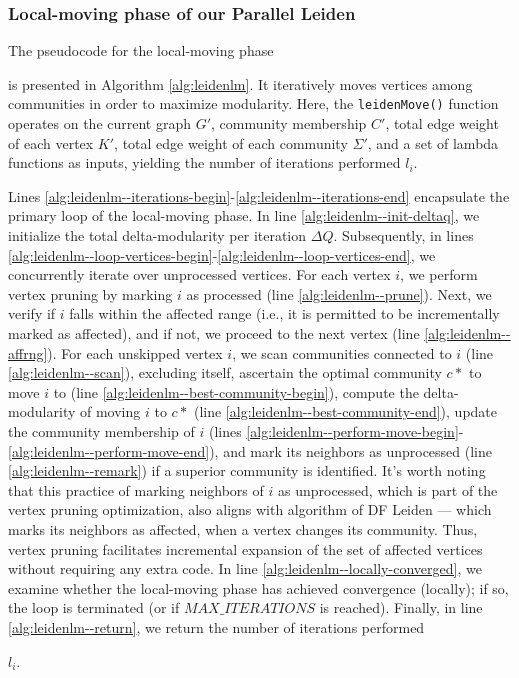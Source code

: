 \subsubsection{Local-moving phase of our Parallel Leiden}

The pseudocode for the local-moving phase is presented in Algorithm \ref{alg:leidenlm}. It iteratively moves vertices among communities in order to maximize modularity. Here, the \texttt{leidenMove()} function operates on the current graph $G'$, community membership $C'$, total edge weight of each vertex $K'$, total edge weight of each community $\Sigma'$, and a set of lambda functions as inputs, yielding the number of iterations performed $l_i$.



Lines \ref{alg:leidenlm--iterations-begin}-\ref{alg:leidenlm--iterations-end} encapsulate the primary loop of the local-moving phase. In line \ref{alg:leidenlm--init-deltaq}, we initialize the total delta-modularity per iteration $\Delta Q$. Subsequently, in lines \ref{alg:leidenlm--loop-vertices-begin}-\ref{alg:leidenlm--loop-vertices-end}, we concurrently iterate over unprocessed vertices. For each vertex $i$, we perform vertex pruning by marking $i$ as processed (line \ref{alg:leidenlm--prune}). Next, we verify if $i$ falls within the affected range (i.e., it is permitted to be incrementally marked as affected), and if not, we proceed to the next vertex (line \ref{alg:leidenlm--affrng}). For each unskipped vertex $i$, we scan communities connected to $i$ (line \ref{alg:leidenlm--scan}), excluding itself, ascertain the optimal community $c*$ to move $i$ to (line \ref{alg:leidenlm--best-community-begin}), compute the delta-modularity of moving $i$ to $c*$ (line \ref{alg:leidenlm--best-community-end}), update the community membership of $i$ (lines \ref{alg:leidenlm--perform-move-begin}-\ref{alg:leidenlm--perform-move-end}), and mark its neighbors as unprocessed (line \ref{alg:leidenlm--remark}) if a superior community is identified. It's worth noting that this practice of marking neighbors of $i$ as unprocessed, which is part of the vertex pruning optimization, also aligns with algorithm of DF Leiden --- which marks its neighbors as affected, when a vertex changes its community. Thus, vertex pruning facilitates incremental expansion of the set of affected vertices without requiring any extra code. In line \ref{alg:leidenlm--locally-converged}, we examine whether the local-moving phase has achieved convergence (locally); if so, the loop is terminated (or if $MAX\_ITERATIONS$ is reached). Finally, in line \ref{alg:leidenlm--return}, we return the number of iterations performed $l_i$.


